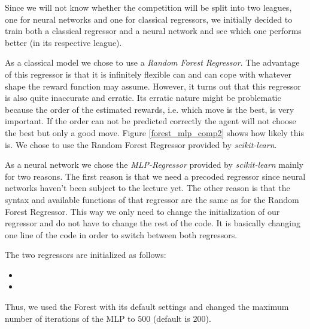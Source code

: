 	Since we will not know whether the competition will be split into two leagues, one for neural networks and one for classical regressors, we initially decided to train both a classical regressor and a neural network and see which one performs better (in its respective league).\par
	
	As a classical model we chose to use a \textit{Random Forest Regressor}. The advantage of this regressor is that it is infinitely flexible can and can cope with whatever shape the reward function may assume. However, it turns out that this regressor is also quite inaccurate and erratic. Its erratic nature might be problematic because the order of the estimated rewards, i.e. which move is the best, is very important. If the order can not be predicted correctly the agent will not choose the best but only a good move. Figure \ref{forest_mlp_comp2} shows how likely this is. We chose to use the Random Forest Regressor provided by \textit{scikit-learn}.\par
	
	As a neural network we chose the \textit{MLP-Regressor} provided by \textit{scikit-learn} mainly for two reasons. The first reason is that we need a precoded regressor since neural networks haven't been subject to the lecture yet. The other reason is that the syntax and available functions of that regressor are the same as for the Random Forest Regressor. This way we only need to change the initialization of our regressor and do not have to change the rest of the code. It is basically changing one line of the code in order to switch between both regressors.\par
	
	The two regressors are initialized as follows:
	\begin{itemize}
		\item {}
		\item {}
	\end{itemize}
	Thus, we used the Forest with its default settings and changed the maximum number of iterations of the MLP to $500$ (default is $200$).
	
